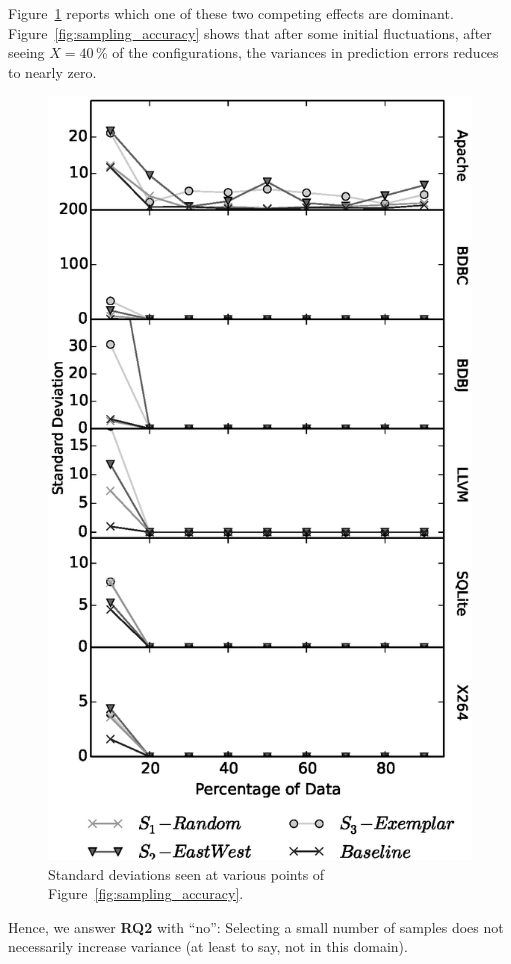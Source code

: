 \documentclass{newsig}
\newcommand{\fig}[1]{Figure~\ref{fig:#1}}
\begin{document}
\fig{Variance} reports which one of these two competing effects are dominant. 
\fig{sampling_accuracy} shows that after some initial fluctuations,
after seeing $X=40$\,\% of the configurations, the variances in prediction errors reduces to nearly zero.


\begin{figure}[tbh]
\centering
\includegraphics[width=0.9\columnwidth]{Figures/Variance}
\caption{Standard deviations seen at various points of  \fig{sampling_accuracy}.}\label{fig:Variance}
\end{figure}

\begin{myshadowbox}
Hence, we answer {\bf RQ2} with ``no'': Selecting a small number of samples does not necessarily increase variance (at least to say, not in this domain).
\end{myshadowbox}
\end{document}
